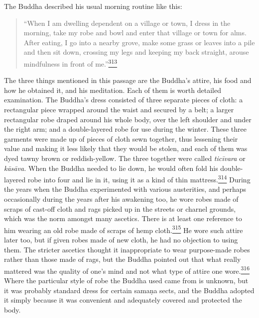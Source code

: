 The Buddha described his usual morning routine like this:

\begin{quote}
``When I am dwelling dependent on a village or town, I dress in the
morning, take my robe and bowl and enter that village or town for alms.
After eating, I go into a nearby grove, make some grass or leaves into a
pile and then sit down, crossing my legs and keeping my back straight,
arouse mindfulness in front of
me.''\label{footprints_split_011.html_fnref313}\hyperref[footprints_split_024.htmlux5cux23fn313]{\textsuperscript{313}}
\end{quote}

The three things mentioned in this passage are the Buddha's attire, his
food and how he obtained it, and his meditation. Each of them is worth
detailed examination. The Buddha's dress consisted of three separate
pieces of cloth: a rectangular piece wrapped around the waist and
secured by a belt; a larger rectangular robe draped around his whole
body, over the left shoulder and under the right arm; and a
double-layered robe for use during the winter. These three garments were
made up of pieces of cloth sewn together, thus lessening their value and
making it less likely that they would be stolen, and each of them was
dyed tawny brown or reddish-yellow. The three together were called
\emph{ticīvara} or \emph{kāsāva.} When the Buddha needed to lie down, he
would often fold his double-layered robe into four and lie in it, using
it as a kind of thin
mattress.\label{footprints_split_011.html_fnref314}\hyperref[footprints_split_024.htmlux5cux23fn314]{\textsuperscript{314}}
During the years when the Buddha experimented with various austerities,
and perhaps occasionally during the years after his awakening too, he
wore robes made of scraps of cast-off cloth and rags picked up in the
streets or charnel grounds, which was the norm amongst many ascetics.
There is at least one reference to him wearing an old robe made of
scraps of hemp
cloth.\label{footprints_split_011.html_fnref315}\hyperref[footprints_split_024.htmlux5cux23fn315]{\textsuperscript{315}}
He wore such attire later too, but if given robes made of new cloth, he
had no objection to using them. The stricter ascetics thought it
inappropriate to wear purpose-made robes rather than those made of rags,
but the Buddha pointed out that what really mattered was the quality of
one's mind and not what type of attire one
wore.\label{footprints_split_011.html_fnref316}\hyperref[footprints_split_024.htmlux5cux23fn316]{\textsuperscript{316}}
Where the particular style of robe the Buddha used came from is unknown,
but it was probably standard dress for certain samaṇa sects, and the
Buddha adopted it simply because it was convenient and adequately
covered and protected the body.

